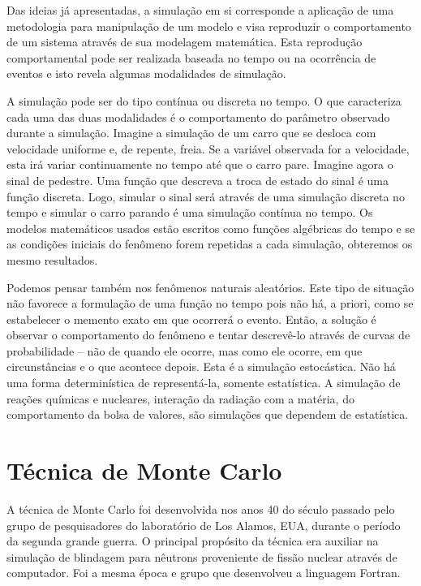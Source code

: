 \documentclass[a4paper,12pt,oneside,onecolumn]{uerj}
\begin{document}
Das ideias já apresentadas, a simulação em si corresponde a aplicação de uma metodologia para manipulação de um modelo e visa reproduzir o comportamento de um sistema através de sua modelagem matemática. Esta reprodução comportamental pode ser realizada baseada no tempo ou na ocorrência de eventos e isto revela algumas modalidades de simulação.

A simulação pode ser do tipo contínua ou discreta no tempo. O que caracteriza cada uma das duas modalidades é o comportamento do parâmetro observado durante a simulação. Imagine a simulação de um carro que se desloca com velocidade uniforme e, de repente, freia. Se a variável observada for a velocidade, esta irá variar continuamente no tempo até que o carro pare. Imagine agora o sinal de pedestre. Uma função que descreva a troca de estado do sinal é uma função discreta. Logo, simular o sinal será através de uma simulação discreta no tempo e simular o carro parando é uma simulação contínua no tempo. Os modelos matemáticos usados estão escritos como funções algébricas do tempo e se as condições iniciais do fenômeno forem repetidas a cada simulação, obteremos os mesmo resultados.

Podemos pensar também nos fenômenos naturais aleatórios. Este tipo de situação não favorece a formulação de uma função no tempo pois não há, a priori, como se estabelecer o memento exato em que ocorrerá o evento. Então, a solução é observar o comportamento do fenômeno e tentar descrevê-lo através de curvas de probabilidade -- não de quando ele ocorre, mas como ele ocorre, em que circunstâncias e o que acontece depois. Esta é a simulação estocástica. Não há uma forma determinística de representá-la, somente estatística. A simulação de reações químicas e nucleares, interação da radiação com a matéria, do comportamento da bolsa de valores, são simulações que dependem de estatística.

\section{Técnica de Monte Carlo}

A técnica de Monte Carlo foi desenvolvida nos anos 40 do século passado pelo grupo de pesquisadores do laboratório de Los Alamos, EUA, durante o período da segunda grande guerra. O principal propósito da técnica era auxiliar na simulação de blindagem para nêutrons proveniente de fissão nuclear através de computador. Foi a mesma época e grupo que desenvolveu a linguagem Fortran.
\end{document}
